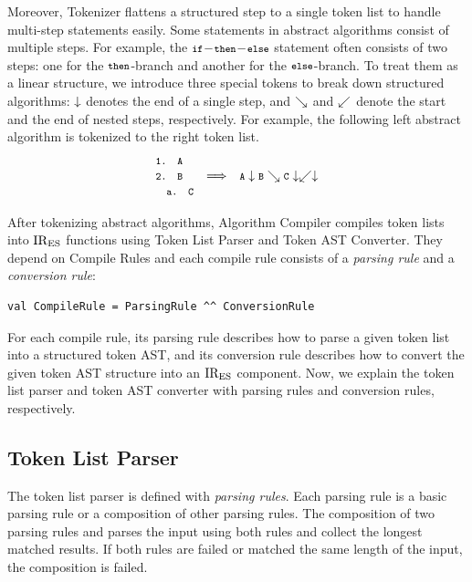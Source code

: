 Moreover, {\sf Tokenizer} flattens a structured step to a single token
list to handle multi-step statements easily.  Some statements in
abstract algorithms consist of multiple steps.  For example, the
\( \texttt{\footnotesize if}\!-\!\texttt{\footnotesize then}\!-\!\texttt{\footnotesize else} \) statement often consists of
two steps: one for the \( \texttt{\footnotesize then} \)-branch and another
for the \( \texttt{\footnotesize else} \)-branch.  To treat them as a linear structure,
we introduce three special tokens to break down structured algorithms:
\( \downarrow \) denotes the end of a single step, and \( \searrow \) and
\( \swarrow \) denote the start and the end of nested steps, respectively.
For example, the following left abstract algorithm is tokenized to the right
token list.
\[
  \begin{array}{lcl}
    \texttt{\footnotesize1. A}\\
    \texttt{\footnotesize2. B} &\Longrightarrow& \texttt{\footnotesize A} \downarrow \texttt{\footnotesize B} \searrow \texttt{\footnotesize C} \downarrow \swarrow \downarrow\\
    \texttt{\footnotesize\ \ a. C}\\
  \end{array}
\]

After tokenizing abstract algorithms, {\sf Algorithm Compiler}
compiles token lists into \( \text{IR}_\text{ES} \) functions using
{\sf Token List Parser} and {\sf Token AST Converter}.
They depend on {\sf Compile Rules} and each compile rule
consists of a \textit{parsing rule} and a \textit{conversion rule}:
\begin{lstlisting}[style=myScalastyle]
val CompileRule = ParsingRule ^^ ConversionRule
\end{lstlisting}
For each compile rule, its parsing rule describes how to parse a given
token list into a structured token AST, and its conversion rule describes
how to convert the given token AST structure into an \( \text{IR}_\text{ES} \) component.
Now, we explain the token list parser and token AST converter with
parsing rules and conversion rules, respectively.


\subsection{Token List Parser}
The token list parser is defined with \textit{parsing rules}. Each parsing rule
is a basic parsing rule or a composition of other parsing rules. The composition
 of two parsing rules  and  parses the input using
both rules and collect the longest matched results.  If both rules are failed or
matched the same length of the input, the composition is failed.

